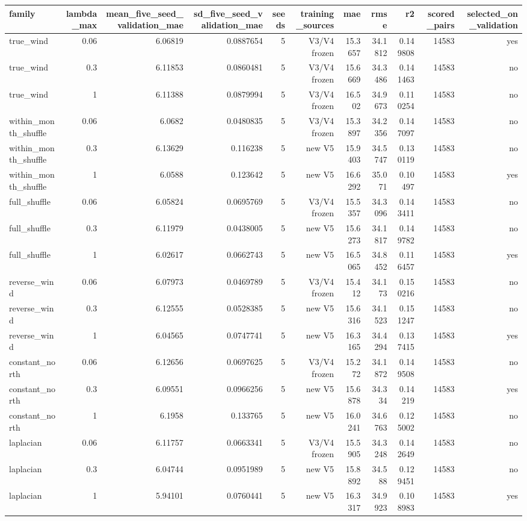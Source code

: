 \begin{tabular}{lrrrrrrrrrr}
\hline
family & lambda\_max & mean\_five\_seed\_validation\_mae & sd\_five\_seed\_validation\_mae & seeds & training\_sources & mae & rmse & r2 & scored\_pairs & selected\_on\_validation \\
\hline
true\_wind & 0.06 & 6.06819 & 0.0887654 & 5 & V3/V4 frozen & 15.3657 & 34.1812 & 0.149808 & 14583 & yes \\
true\_wind & 0.3 & 6.11853 & 0.0860481 & 5 & V3/V4 frozen & 15.6669 & 34.3486 & 0.141463 & 14583 & no \\
true\_wind & 1 & 6.11388 & 0.0879994 & 5 & V3/V4 frozen & 16.502 & 34.9673 & 0.110254 & 14583 & no \\
within\_month\_shuffle & 0.06 & 6.0682 & 0.0480835 & 5 & V3/V4 frozen & 15.3897 & 34.2356 & 0.147097 & 14583 & no \\
within\_month\_shuffle & 0.3 & 6.13629 & 0.116238 & 5 & new V5 & 15.9403 & 34.5747 & 0.130119 & 14583 & no \\
within\_month\_shuffle & 1 & 6.0588 & 0.123642 & 5 & new V5 & 16.6292 & 35.071 & 0.10497 & 14583 & yes \\
full\_shuffle & 0.06 & 6.05824 & 0.0695769 & 5 & V3/V4 frozen & 15.5357 & 34.3096 & 0.143411 & 14583 & no \\
full\_shuffle & 0.3 & 6.11979 & 0.0438005 & 5 & new V5 & 15.6273 & 34.1817 & 0.149782 & 14583 & no \\
full\_shuffle & 1 & 6.02617 & 0.0662743 & 5 & new V5 & 16.5065 & 34.8452 & 0.116457 & 14583 & yes \\
reverse\_wind & 0.06 & 6.07973 & 0.0469789 & 5 & V3/V4 frozen & 15.412 & 34.173 & 0.150216 & 14583 & no \\
reverse\_wind & 0.3 & 6.12555 & 0.0528385 & 5 & new V5 & 15.6316 & 34.1523 & 0.151247 & 14583 & no \\
reverse\_wind & 1 & 6.04565 & 0.0747741 & 5 & new V5 & 16.3165 & 34.4294 & 0.137415 & 14583 & yes \\
constant\_north & 0.06 & 6.12656 & 0.0697625 & 5 & V3/V4 frozen & 15.272 & 34.1872 & 0.149508 & 14583 & no \\
constant\_north & 0.3 & 6.09551 & 0.0966256 & 5 & new V5 & 15.6878 & 34.334 & 0.14219 & 14583 & yes \\
constant\_north & 1 & 6.1958 & 0.133765 & 5 & new V5 & 16.0241 & 34.6763 & 0.125002 & 14583 & no \\
laplacian & 0.06 & 6.11757 & 0.0663341 & 5 & V3/V4 frozen & 15.5905 & 34.3248 & 0.142649 & 14583 & no \\
laplacian & 0.3 & 6.04744 & 0.0951989 & 5 & new V5 & 15.8892 & 34.588 & 0.129451 & 14583 & no \\
laplacian & 1 & 5.94101 & 0.0760441 & 5 & new V5 & 16.3317 & 34.9923 & 0.108983 & 14583 & yes \\
\hline
\end{tabular}
